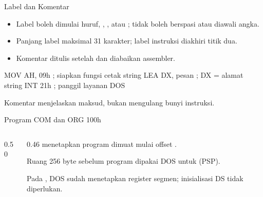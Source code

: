 \documentclass[aspectratio=169,11pt]{beamer}
\begin{document}
\begin{frame}[fragile]{Label dan Komentar}
\small
\begin{itemize}
    \item Label boleh dimulai huruf, , \code{\_}, atau
          ; tidak boleh berspasi atau diawali angka.
    \item Panjang label maksimal 31 karakter; label instruksi
          diakhiri titik dua.
    \item Komentar ditulis setelah \code{;} dan diabaikan assembler.
\end{itemize}

\vspace{0.2em}
\begin{kodeasm}[numbers=none]
MOV AH, 09h     ; siapkan fungsi cetak string
LEA DX, pesan   ; DX = alamat string
INT 21h         ; panggil layanan DOS
\end{kodeasm}

\vspace{0.1em}
{\footnotesize\color{obeGray}Komentar menjelaskan maksud, bukan
mengulang bunyi instruksi.\par}
\end{frame}

\begin{frame}[fragile]{Program COM dan ORG 100h}
\begin{columns}[t]
\begin{column}{0.50\textwidth}
\end{column}
\begin{column}{0.46\textwidth}
\footnotesize
{} menetapkan program dimuat mulai offset
.

\vspace{0.3em}
Ruang 256 byte sebelum program dipakai DOS untuk
 (PSP).

\vspace{0.3em}
Pada , DOS sudah menetapkan register segmen; inisialisasi
DS tidak diperlukan.
\end{column}
\end{columns}
\end{frame}
\end{document}
